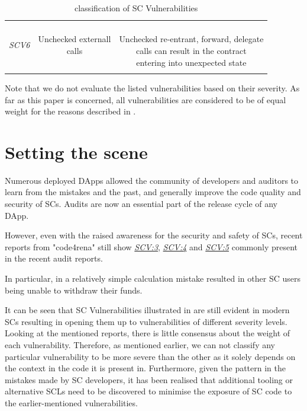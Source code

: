 \documentclass[oneside]{ecsproject}     %
\newcommand{\vref}[1]{\textit{\hyperref[#1]{#1}}}
\begin{document}
\begin{table}[!htb]
\begin{tabular}{ccc}
  \hline
  \textit{SCV6}\label{SCV:6} & \makecell{Unchecked externall\\calls} & \makecell{\\Unchecked re-entrant, forward, delegate\\calls can result in the contract\\entering into unexpected state}\\\\
  \bottomrule
  \end{tabular}
  \caption{classification of SC Vulnerabilities}
  \label{Table:classification}
\end{table}

Note that we do not evaluate the listed vulnerabilities based on their severity. 
As far as this paper is concerned, all vulnerabilities are considered to be of equal weight for the reasons described in .

\section{Setting the scene} \label{Section:Scene}

Numerous deployed DApps allowed the community of developers and auditors to learn from the mistakes and the past,
and generally improve the code quality and security of SCs. Audits are now an essential part of the release cycle of any DApp.

However, even with the raised awareness for the security and safety of SCs, recent reports from "code4rena" still show \vref{SCV:3}, \vref{SCV:4} and \vref{SCV:5}
commonly present in the recent audit reports\cite{arcade_report}\cite{ondo_report}\cite{centrifuge_report}.

In particular, in \cite{centrifuge_report} a relatively simple calculation mistake resulted in other SC users being unable to withdraw their funds.

It can be seen that SC Vulnerabilities illustrated in  are still evident in modern SCs resulting in opening them up to vulnerabilities of different severity levels.
Looking at the mentioned reports, there is little consensus about the weight of each vulnerability.
Therefore, as mentioned earlier, we can not classify any particular vulnerability to be more severe than the other as it solely depends on the context in the code it is present in.
Furthermore, given the pattern in the mistakes made by SC developers, 
it has been realised that additional tooling or alternative SCLs need to be discovered to minimise the exposure of SC code to the earlier-mentioned vulnerabilities.
\end{document}

